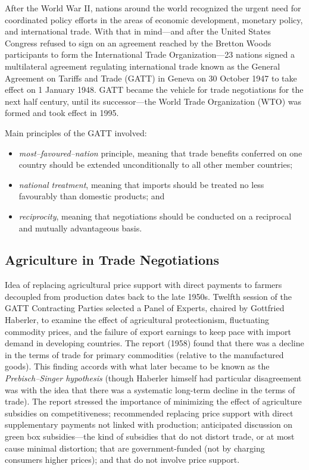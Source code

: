 \documentclass[
]{book}
\providecommand{\tightlist}{%
  \setlength{\itemsep}{0pt}\setlength{\parskip}{0pt}}
\begin{document}
After the World War II, nations around the world recognized the urgent need for coordinated policy efforts in the areas of economic development, monetary policy, and international trade. With that in mind---and after the United States Congress refused to sign on an agreement reached by the Bretton Woods participants to form the International Trade Organization---23 nations signed a multilateral agreement regulating international trade known as the General Agreement on Tariffs and Trade (GATT) in Geneva on 30 October 1947 to take effect on 1 January 1948. GATT became the vehicle for trade negotiations for the next half century, until its successor---the World Trade Organization (WTO) was formed and took effect in 1995.

Main principles of the GATT involved:

\begin{itemize}
\tightlist
\item
  \emph{most--favoured--nation} principle, meaning that trade benefits conferred on one country should be extended unconditionally to all other member countries;
\item
  \emph{national treatment}, meaning that imports should be treated no less favourably than domestic products; and
\item
  \emph{reciprocity}, meaning that negotiations should be conducted on a reciprocal and mutually advantageous basis.
\end{itemize}

\hypertarget{agriculture-in-trade-negotiations}{%
\subsection{Agriculture in Trade Negotiations}\label{agriculture-in-trade-negotiations}}

Idea of replacing agricultural price support with direct payments to farmers decoupled from production dates back to the late 1950s. Twelfth session of the GATT Contracting Parties selected a Panel of Experts, chaired by Gottfried Haberler, to examine the effect of agricultural protectionism, fluctuating commodity prices, and the failure of export earnings to keep pace with import demand in developing countries. The report (1958) found that there was a decline in the terms of trade for primary commodities (relative to the manufactured goods). This finding accords with what later became to be known as the \emph{Prebisch--Singer hypothesis} (though Haberler himself had particular disagreement was with the idea that there was a systematic long-term decline in the terms of trade). The report stressed the importance of minimizing the effect of agriculture subsidies on competitiveness; recommended replacing price support with direct supplementary payments not linked with production; anticipated discussion on green box subsidies---the kind of subsidies that do not distort trade, or at most cause minimal distortion; that are government-funded (not by charging consumers higher prices); and that do not involve price support.
\end{document}
